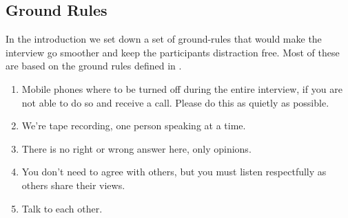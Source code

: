 \subsection{Ground Rules}
In the introduction we set down a set of ground-rules that would make the interview go smoother and keep the participants distraction free. Most of these are based on the ground rules defined in \citet{FocusGrpGuide}.

\begin{enumerate}
\item Mobile phones where to be turned off during the entire interview, if you are not able to do so and receive a call. Please do this as quietly as possible.
\item We're tape recording, one person speaking at a time.
\item There is no right or wrong answer here, only opinions.
\item You don't need to agree with others, but you must listen respectfully as others share their views.
\item Talk to each other.
\end{enumerate}

